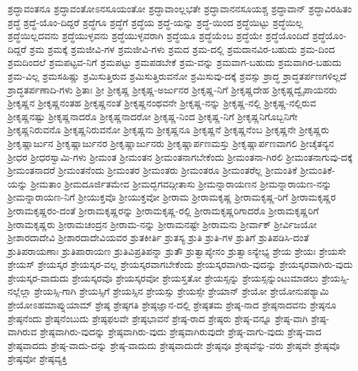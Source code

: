 {ಶ್ರದ್ಧಾವಂತನೂ
ಶ್ರದ್ಧಾವಂತೋಽನಸೂಯಂತೋ
ಶ್ರದ್ಧಾವಾಂಲ್ಲಭತೇ
ಶ್ರದ್ಧಾವಾನನಸೂಯಶ್ಚ
ಶ್ರದ್ಧಾವಾನ್
ಶ್ರದ್ಧಾವಿರಹಿತಂ
ಶ್ರದ್ಧೆ
ಶ್ರದ್ಧೆ-ಯೊಂ-ದಿದ್ದರೆ
ಶ್ರದ್ಧೆಗೂ
ಶ್ರದ್ಧೆಗೆ
ಶ್ರದ್ಧೆಯ
ಶ್ರದ್ಧೆ-ಯನ್ನು
ಶ್ರದ್ಧೆ-ಯಿಂದ
ಶ್ರದ್ಧೆಯಿಟ್ಟು
ಶ್ರದ್ಧೆಯಿಲ್ಲ
ಶ್ರದ್ಧೆಯಿಲ್ಲದವನು
ಶ್ರದ್ಧೆಯುಳ್ಳವನು
ಶ್ರದ್ಧೆಯುಳ್ಳವರಾಗಿ
ಶ್ರದ್ಧೆಯೂ
ಶ್ರದ್ಧೆಯೆಂಬ
ಶ್ರದ್ಧೆಯೇ
ಶ್ರದ್ಧೆಯೊಂದಿದೆ
ಶ್ರದ್ಧೆಯೊಂ-ದಿದ್ದರೆ
ಶ್ರಮ
ಶ್ರಮಕ್ಕೆ
ಶ್ರಮಜೀವಿ-ಗಳ
ಶ್ರಮಜೀವಿ-ಗಳು
ಶ್ರಮದ
ಶ್ರಮ-ದಲ್ಲಿ
ಶ್ರಮದಾನವಿರ-ಬಹುದು
ಶ್ರಮ-ದಿಂದ
ಶ್ರಮದಿಂದಲೆ
ಶ್ರಮಪಟ್ಟವ-ನಿಗೆ
ಶ್ರಮಪಟ್ಟು
ಶ್ರಮಪಡಬೇಕೆ
ಶ್ರಮ-ವನ್ನು
ಶ್ರಮವಾಗ-ಬಹುದು
ಶ್ರಮವಾಗಿರ-ಬಹುದು
ಶ್ರಮ-ವಿಲ್ಲ
ಶ್ರಮಸಹಿಷ್ಣು
ಶ್ರಮಿಸುತ್ತಿರುವ
ಶ್ರಮಿಸುತ್ತಿರುವನೋ
ಶ್ರಮಿಸುವು-ದಕ್ಕೆ
ಶ್ರವಸ್ಸು
ಶ್ರಾದ್ಧ
ಶ್ರಾದ್ಧತರ್ಪಣಗಳಿಲ್ಲದೆ
ಶ್ರಾದ್ಧತರ್ಪಣಾದಿ-ಗಳು
ಶ್ರಿತಾಃ
ಶ್ರೀ
ಶ್ರೀಕೃಷ್ಣ
ಶ್ರೀಕೃಷ್ಣ-ಅರ್ಜುನರ
ಶ್ರೀಕೃಷ್ಣ-ನಿಗೆ
ಶ್ರೀಕೃಷ್ಣದೇಹ
ಶ್ರೀಕೃಷ್ಣದ್ವೈಪಾಯನರು
ಶ್ರೀಕೃಷ್ಣನ
ಶ್ರೀಕೃಷ್ಣನಂತಹ
ಶ್ರೀಕೃಷ್ಣನಂತೆ
ಶ್ರೀಕೃಷ್ಣನಂಥವನೇ
ಶ್ರೀಕೃಷ್ಣ-ನನ್ನು
ಶ್ರೀಕೃಷ್ಣ-ನಲ್ಲಿ
ಶ್ರೀಕೃಷ್ಣ-ನಲ್ಲಿರುವ
ಶ್ರೀಕೃಷ್ಣನಷ್ಟು
ಶ್ರೀಕೃಷ್ಣನಾದರೊ
ಶ್ರೀಕೃಷ್ಣನಾದರೋ
ಶ್ರೀಕೃಷ್ಣ-ನಿಂದ
ಶ್ರೀಕೃಷ್ಣ-ನಿಗೆ
ಶ್ರೀಕೃಷ್ಣನಿಗೊಬ್ಬನಿಗೇ
ಶ್ರೀಕೃಷ್ಣನಿರುವನೊ
ಶ್ರೀಕೃಷ್ಣನಿರುವನೋ
ಶ್ರೀಕೃಷ್ಣನು
ಶ್ರೀಕೃಷ್ಣನೂ
ಶ್ರೀಕೃಷ್ಣನೆ
ಶ್ರೀಕೃಷ್ಣನೆಂಬ
ಶ್ರೀಕೃಷ್ಣನೇ
ಶ್ರೀಕೃಷ್ಣರು
ಶ್ರೀಕೃಷ್ಣಾರ್ಜುನ
ಶ್ರೀಕೃಷ್ಣಾರ್ಜುನರ
ಶ್ರೀಕೃಷ್ಣಾರ್ಜುನರು
ಶ್ರೀಕೃಷ್ಣಾರ್ಪಣಮಸ್ತು
ಶ್ರೀಕೃಷ್ಣಾರ್ಪಣವಾಗಲಿ
ಶ್ರೀಚೈತನ್ಯನ
ಶ್ರೀಧರ
ಶ್ರೀಧರಸ್ವಾಮಿ-ಗಳು
ಶ್ರೀಮಂತ
ಶ್ರೀಮಂತನ
ಶ್ರೀಮಂತನಾಗಬೇಕೆಂದು
ಶ್ರೀಮಂತನಾ-ಗಿರಲಿ
ಶ್ರೀಮಂತನಾಗುವು-ದಕ್ಕೆ
ಶ್ರೀಮಂತನಾದರೆ
ಶ್ರೀಮಂತನೆಂದು
ಶ್ರೀಮಂತರ
ಶ್ರೀಮಂತರು
ಶ್ರೀಮಂತರೂ
ಶ್ರೀಮಂತರೆಲ್ಲ
ಶ್ರೀಮಂತಿಕೆ
ಶ್ರೀಮಂತಿಕೆ-ಯನ್ನು
ಶ್ರೀಮತಾಂ
ಶ್ರೀಮದೂರ್ಜಿತಮೇವ
ಶ್ರೀಮದ್ಭಗವದ್ಗೀತಾಸು
ಶ್ರೀಮನ್ನಾರಾಯಣನ
ಶ್ರೀಮನ್ನಾರಾಯಣ-ನನ್ನು
ಶ್ರೀಮನ್ನಾರಾಯಣ-ನಿಗೆ
ಶ್ರೀಯುಕ್ತವೊ
ಶ್ರೀಯುಕ್ತವೋ
ಶ್ರೀರಾಮ
ಶ್ರೀರಾಮಕೃಷ್ಣ
ಶ್ರೀರಾಮಕೃಷ್ಣ-ರಿಗೆ
ಶ್ರೀರಾಮಕೃಷ್ಣರ
ಶ್ರೀರಾಮಕೃಷ್ಣರಂ-ದಂತೆ
ಶ್ರೀರಾಮಕೃಷ್ಣರನ್ನು
ಶ್ರೀರಾಮಕೃಷ್ಣ-ರಲ್ಲಿ
ಶ್ರೀರಾಮಕೃಷ್ಣರಿಗಾದರೊ
ಶ್ರೀರಾಮಕೃಷ್ಣರಿಗೆ
ಶ್ರೀರಾಮಕೃಷ್ಣರು
ಶ್ರೀರಾಮಚಂದ್ರನ
ಶ್ರೀರಾಮ-ನನ್ನು
ಶ್ರೀರಾಮನಷ್ಟೇ
ಶ್ರೀರಾಮನು
ಶ್ರೀರ್ವಾಕ್
ಶ್ರೀರ್ವಿಜಯೋ
ಶ್ರೀಶಾರದಾದೇವಿ
ಶ್ರೀಶಾರದಾದೇವಿಯವರ
ಶ್ರುತಕೀರ್ತಿ
ಶ್ರುತಸ್ಯ
ಶ್ರುತಿ
ಶ್ರುತಿ-ಗಳ
ಶ್ರುತಿಗೆ
ಶ್ರುತಿಪಡಿಸಿ-ದಂತೆ
ಶ್ರುತಿಪರಾಯಣಾಃ
ಶ್ರುತಿಪಾರಾಯಣ
ಶ್ರುತಿವಿಪ್ರತಿಪನ್ನಾ
ಶ್ರುತೌ
ಶ್ರುತ್ವಾಪ್ಯೇನಂ
ಶ್ರುತ್ವಾಽನ್ಯೇಭ್ಯ
ಶ್ರೇಯ
ಶ್ರೇಯಃ
ಶ್ರೇಯಸೇ
ಶ್ರೇಯಸ್
ಶ್ರೇಯಸ್ಕರ
ಶ್ರೇಯಸ್ಕರ-ವಲ್ಲ
ಶ್ರೇಯಸ್ಕರವಾಗಬೇಕೆಂದು
ಶ್ರೇಯಸ್ಕರವಾಗಿರು-ವುದನ್ನು
ಶ್ರೇಯಸ್ಕರವಾಗಿರು-ವುದು
ಶ್ರೇಯಸ್ಕರ-ವಾದುದು
ಶ್ರೇಯಸ್ಕರವೊ
ಶ್ರೇಯಸ್ಕರವೋ
ಶ್ರೇಯಸ್ತತೋ
ಶ್ರೇಯಸ್ಸನ್ನು
ಶ್ರೇಯಸ್ಸನ್ನುಂಟುಮಾಡಲು
ಶ್ರೇಯಸ್ಸಿ-ನಲ್ಲೆಲ್ಲಾ
ಶ್ರೇಯಸ್ಸಿ-ಗಾಗಿ
ಶ್ರೇಯಸ್ಸಿಗೆ
ಶ್ರೇಯಸ್ಸಿನ
ಶ್ರೇಯಸ್ಸು
ಶ್ರೇಯಸ್ಸೇ
ಶ್ರೇಯಾನ್
ಶ್ರೇಯೋ
ಶ್ರೇಯೋನುಪಶ್ಯಾಮಿ
ಶ್ರೇಯೋಽಹಮಾಪ್ನುಯಾಮ್
ಶ್ರೇಷ್ಠ
ಶ್ರೇಷ್ಠಗತಿ
ಶ್ರೇಷ್ಠಜ್ಞಾನ-ದಲ್ಲಿ
ಶ್ರೇಷ್ಠತಮ
ಶ್ರೇಷ್ಠ-ನಾದ
ಶ್ರೇಷ್ಠನಾದವನು
ಶ್ರೇಷ್ಠನೂ
ಶ್ರೇಷ್ಠನೆಂದು
ಶ್ರೇಷ್ಠನೆಂಬುದು
ಶ್ರೇಷ್ಠಫಲವೇ
ಶ್ರೇಷ್ಠಭಾವನೆ
ಶ್ರೇಷ್ಠ-ರಾದ
ಶ್ರೇಷ್ಠರು
ಶ್ರೇಷ್ಠ-ವನ್ನೂ
ಶ್ರೇಷ್ಠ-ವಾಗಿ
ಶ್ರೇಷ್ಠ-ವಾಗಿರುವ
ಶ್ರೇಷ್ಠವಾಗಿರು-ವುದನ್ನು
ಶ್ರೇಷ್ಠವಾಗಿರು-ವುದು
ಶ್ರೇಷ್ಠವಾಗಿರುವುದೇ
ಶ್ರೇಷ್ಠ-ವಾಗು-ವುದು
ಶ್ರೇಷ್ಠ-ವಾದ
ಶ್ರೇಷ್ಠವಾದದು
ಶ್ರೇಷ್ಠ-ವಾದು-ದನ್ನು
ಶ್ರೇಷ್ಠ-ವಾದುದು
ಶ್ರೇಷ್ಠವಾದುದೇ
ಶ್ರೇಷ್ಠವೂ
ಶ್ರೇಷ್ಠವೆನ್ನು-ವರು
ಶ್ರೇಷ್ಠವೇ
ಶ್ರೇಷ್ಠವೊ
ಶ್ರೇಷ್ಠವೋ
ಶ್ರೇಷ್ಠವ್ಯಕ್ತಿ
}
